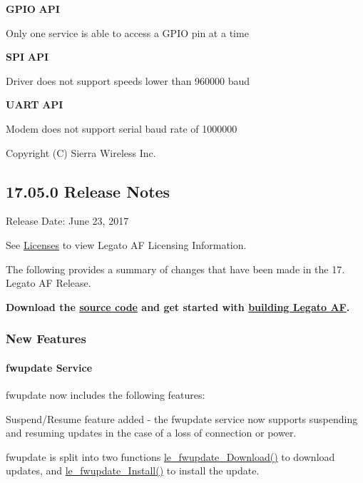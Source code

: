 {\bfseries G\+P\+IO} {\bfseries A\+PI} 
\begin{DoxyItemize}
\item Only one service is able to access a G\+P\+IO pin at a time
\end{DoxyItemize}

{\bfseries S\+PI} {\bfseries A\+PI} 
\begin{DoxyItemize}
\item Driver does not support speeds lower than 960000 baud
\end{DoxyItemize}

{\bfseries U\+A\+RT} {\bfseries A\+PI} 
\begin{DoxyItemize}
\item Modem does not support serial baud rate of 1000000
\end{DoxyItemize}

Copyright (C) Sierra Wireless Inc. \hypertarget{releaseNotes17050}{}\subsection{17.05.0 Release Notes}\label{releaseNotes17050}
Release Date\+: June 23, 2017

See \hyperlink{aboutLicenses}{Licenses} to view Legato AF Licensing Information.

The following provides a summary of changes that have been made in the 17. Legato AF Release.

{\bfseries  Download the \hyperlink{aboutReleaseInfo}{source code} and get started with \hyperlink{basicBuild}{building Legato AF}. }\hypertarget{releaseNotes17050_rn17_05_Features}{}\subsubsection{New Features}\label{releaseNotes17050_rn17_05_Features}
\hypertarget{releaseNotes17050_rn17_05_FeaturesFwupdate}{}\paragraph{fwupdate Service}\label{releaseNotes17050_rn17_05_FeaturesFwupdate}
fwupdate now includes the following features\+:
\begin{DoxyItemize}
\item Suspend/\+Resume feature added -\/ the fwupdate service now supports suspending and resuming updates in the case of a loss of connection or power.
\item fwupdate is split into two functions \hyperlink{le__fwupdate__interface_8h_ab68f3a7c5d4284306468e888bf6a8796}{le\+\_\+fwupdate\+\_\+\+Download()} to download updates, and \hyperlink{le__fwupdate__interface_8h_a534e72fc1a6c20a36a9bdf4a58074159}{le\+\_\+fwupdate\+\_\+\+Install()} to install the update.
\end{DoxyItemize}

